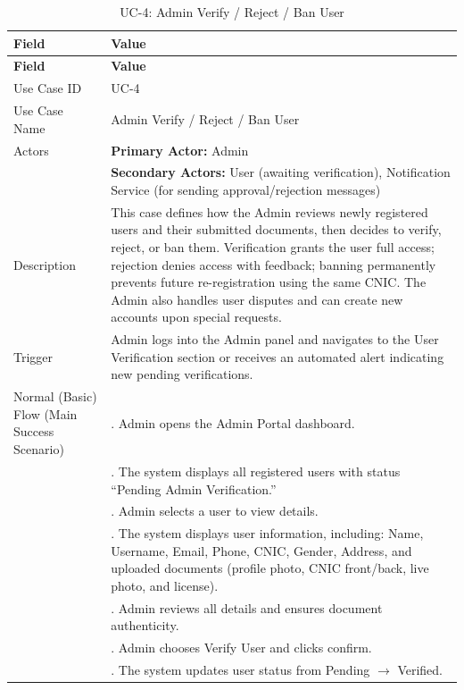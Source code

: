 \begin{longtable}{|>{\raggedright\arraybackslash}p{4cm}|>{\raggedright\arraybackslash}p{11cm}|}
\caption{UC-4: Admin Verify / Reject / Ban User}
\label{tab:uc-4} \\
\hline
\rowcolor{lightgray!30}
\textbf{Field} & \textbf{Value} \\
\hline
\endfirsthead
\hline
\rowcolor{lightgray!30}
\textbf{Field} & \textbf{Value} \\
\hline
\endhead
\hline
\endfoot
\hline
\endlastfoot
Use Case ID & UC-4 \\
\hline
Use Case Name & Admin Verify / Reject / Ban User \\
\hline
Actors & \textbf{Primary Actor:} Admin \\
& \textbf{Secondary Actors:} User (awaiting verification), Notification Service (for sending approval/rejection messages) \\
\hline
Description & This case defines how the Admin reviews newly registered users and their submitted documents, then decides to verify, reject, or ban them. Verification grants the user full access; rejection denies access with feedback; banning permanently prevents future re-registration using the same CNIC. The Admin also handles user disputes and can create new accounts upon special requests. \\
\hline
Trigger & Admin logs into the Admin panel and navigates to the User Verification section or receives an automated alert indicating new pending verifications. \\
\hline
Normal (Basic) Flow (Main Success Scenario) & 1. Admin opens the Admin Portal dashboard. \\
& 2. The system displays all registered users with status ``Pending Admin Verification.'' \\
& 3. Admin selects a user to view details. \\
& 4. The system displays user information, including: Name, Username, Email, Phone, CNIC, Gender, Address, and uploaded documents (profile photo, CNIC front/back, live photo, and license). \\
& 5. Admin reviews all details and ensures document authenticity. \\
& 6. Admin chooses Verify User and clicks confirm. \\
& 7. The system updates user status from Pending $\rightarrow$ Verified. \\

\end{longtable}
